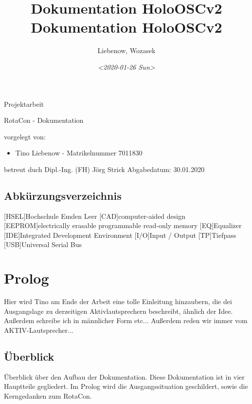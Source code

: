 \documentclass[11pt, titlepage, fleqn]{report}
\author{Liebenow, Wozasek}
\date{\textit{<2020-01-26 Sun>}}
\title{Dokumentation HoloOSCv2\\\medskip
\large Dokumentation HoloOSCv2}
\begin{document}
\begin{titlepage}%
	\hsellogo\hfill Projektarbeit %
	\par
	\vspace{4cm}
	\noindent\parbox{0.8\textwidth}{\Huge RotaCon - Dokumentation}  
	\vspace{2cm}

	\Large \noindent vorgelegt von:
	\begin{itemize}
		\item Tino Liebenow - Matrikelnummer 7011830
	\end{itemize}
	\vspace{2cm}
	betreut duch\newline
	Dipl.-Ing. (FH) Jörg Strick\newline
	Abgabedatum: 30.01.2020
\end{titlepage}
	\newpage
	\tableofcontents
	\listoffigures%
	\listoftables
    \newpage
    \section*{\Huge Abkürzungsverzeichnis}%
    \label{sec:Abkürzungsverzeichnis}
    \vspace{1cm}
    \begin{acronym}
		{Hochschule Emden Leer}
		[CAD]{computer-aided design}
		[EEPROM]{electrically erasable programmable read-only memory}
		[EQ]{Equalizer}
		[IDE]{Integrated Development Environment}
		[I/O]{Input / Output}
		[TP]{Tiefpass}
		[USB]{Universal Serial Bus}
    \end{acronym}
	\newpage
	\chapter{Prolog}
		Hier wird Tino am Ende der Arbeit eine tolle Einleitung hinzaubern, die dei Ausgangslage zu derzeitigen Aktivlautsprechern beschreibt, ähnlich der Idee. Außerdem schreibe ich in männlicher Form etc...\newline
		Außerdem reden wir immer vom AKTIV-Lautsprecher...
	\section{Überblick}
		Überblick über den Aufbau der Dokumentation.\newline
		Diese Dokumentation ist in vier Hauptteile gegliedert. Im Prolog wird die Ausgangssituation geschildert, sowie die Kerngedanken zum RotaCon.
\end{document}
